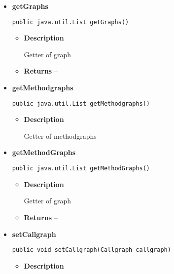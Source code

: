{{{{{{{{{{{{{\begin{itemize}
{\begin{itemize}
{}%
\end{itemize}
}%
\item{ 
{\bf  getGraphs}\\
\begin{lstlisting}[frame=none]
public java.util.List getGraphs()\end{lstlisting} %
\begin{itemize}
\item{
{\bf  Description}

Getter of graph
}
\item{{\bf  Returns} -- 
 
}%
\end{itemize}
}%
\item{ 
{\bf  getMethodgraphs}\\
\begin{lstlisting}[frame=none]
public java.util.List getMethodgraphs()\end{lstlisting} %
\begin{itemize}
\item{
{\bf  Description}

Getter of methodgraphs
}
\end{itemize}
}%
\item{ 
{\bf  getMethodGraphs}\\
\begin{lstlisting}[frame=none]
public java.util.List getMethodGraphs()\end{lstlisting} %
\begin{itemize}
\item{
{\bf  Description}

Getter of graph
}
\item{{\bf  Returns} -- 
 
}%
\end{itemize}
}%
\item{ 
{\bf  setCallgraph}\\
\begin{lstlisting}[frame=none]
public void setCallgraph(Callgraph callgraph)\end{lstlisting} %
\begin{itemize}
\item{
{\bf  Description}

}
\end{itemize}}
\end{itemize}}}}}}}}}}}}}}
